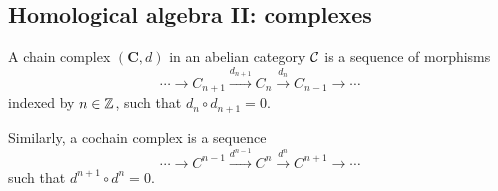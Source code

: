 




\subsection{Homological algebra II: complexes}

\begin{defn}
    A chain complex $(\bm{C},d)$ in an abelian category $\mathcal{C}$ is a sequence  of morphisms 
    \[\cdots\to C_{n+1}\overset{d_{n+1}}\to C_n\overset{d_n}\to C_{n-1}\to\cdots\]
    indexed by $n\in \mathbb{Z}$, such that $d_n\circ d_{n+1}=0$.
    
    Similarly, a cochain complex is a sequence
    \[\cdots\to C^{n-1}\overset{d^{n-1}}\to C^n\overset{d^n}\to C^{n+1}\to\cdots\]
    such that $d^{n+1}\circ d^n=0$.
\end{defn}

